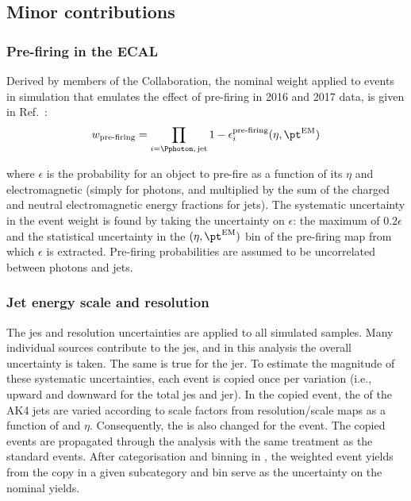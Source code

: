 \subsection{Minor contributions}
\label{subsec:htoinv_minor_weights_systs}




\subsubsection{Pre-firing in the ECAL}
\label{subsubsec:htoinv_ecal_prefiring_weight}

Derived by members of the Collaboration, the nominal weight applied to events in simulation that emulates the effect of pre-firing in 2016 and 2017 data, is given in Ref.~:
\begin{equation}
    w_{\text{pre-firing}} = \prod_{i = \Pphoton,\, \mathrm{jet}} 1 - \epsilon_i^{\text{pre-firing}}(\eta, \pt^{\mathrm{EM}})
    \label{eq:prefiring_weight}
\end{equation}

where $\epsilon$ is the probability for an object to pre-fire as a function of its $\eta$ and electromagnetic \pt (simply \pt for photons, and \pt multiplied by the sum of the charged and neutral electromagnetic energy fractions for \glspl{jet}). The systematic uncertainty in the event weight is found by taking the uncertainty on $\epsilon$: the maximum of $\text{0.2}\epsilon$ and the statistical uncertainty in the $(\eta, \pt^{\mathrm{EM}})$ bin of the pre-firing map from which $\epsilon$ is extracted. Pre-firing probabilities are assumed to be uncorrelated between photons and jets.





\subsubsection{Jet energy scale and resolution}
\label{subsubsec:htoinv_JES_JER_systs}

The \acrfull{jes} and resolution uncertainties are applied to all simulated samples. Many individual sources contribute to the \acrshort{jes}, and in this analysis the overall uncertainty is taken. The same is true for the \acrshort{jer}. To estimate the magnitude of these systematic uncertainties, each event is copied once per variation (i.e., upward and downward for the total \acrshort{jes} and \acrshort{jer}). In the copied event, the \pt of the AK4 \glspl{jet} are varied according to scale factors from resolution/scale maps as a function of \pt and $\eta$. Consequently, the \ptvecmiss is also changed for the event. The copied events are propagated through the analysis with the same treatment as the standard events. After categorisation and binning in \ptmiss, the weighted event yields from the copy in a given subcategory and \ptmiss bin serve as the uncertainty on the nominal yields.

